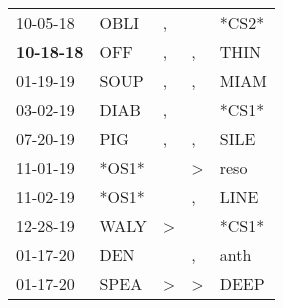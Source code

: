 \begin{supertabular}{p{0.07\textwidth}p{0.06\textwidth}p{0.02\textwidth}p{0.02\textwidth}p{0.06\textwidth}}
          10-05-18\textsuperscript{} &           OBLI\textsuperscript{} &                , &               &                            *CS2* \\
 \textbf{10-18-18\textsuperscript{}} &            OFF\textsuperscript{} &                , &             , &           THIN\textsuperscript{} \\
          01-19-19\textsuperscript{} &           SOUP\textsuperscript{} &                , &             , &           MIAM\textsuperscript{} \\
          03-02-19\textsuperscript{} &           DIAB\textsuperscript{} &                , &               &                            *CS1* \\
          07-20-19\textsuperscript{} &            PIG\textsuperscript{} &                , &             , &           SILE\textsuperscript{} \\
          11-01-19\textsuperscript{} &                            *OS1* &                  &  \textgreater &           reso\textsuperscript{} \\
          11-02-19\textsuperscript{} &                            *OS1* &                  &             , &           LINE\textsuperscript{} \\
          12-28-19\textsuperscript{} &           WALY\textsuperscript{} &     \textgreater &               &                            *CS1* \\
          01-17-20\textsuperscript{} &            DEN\textsuperscript{} &                  &             , &           anth\textsuperscript{} \\
          01-17-20\textsuperscript{} &           SPEA\textsuperscript{} &     \textgreater &  \textgreater &           DEEP\textsuperscript{} \\
\end{supertabular}
